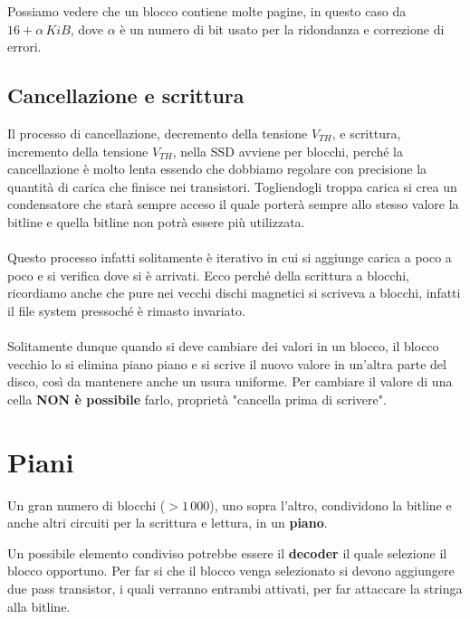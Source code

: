 Possiamo vedere che un blocco contiene molte pagine, in questo caso da $16 + \alpha \,KiB$, dove $\alpha$ è un numero di bit usato per la ridondanza e correzione di errori.

\subsection{Cancellazione e scrittura}
Il processo di cancellazione, decremento della tensione $V_{TH}$, e scrittura, incremento della tensione $V_{TH}$, nella SSD avviene per blocchi, perché la cancellazione è molto lenta essendo che dobbiamo regolare con precisione la quantità di carica che finisce nei transistori. Togliendogli troppa carica si crea un condensatore che starà sempre acceso il quale porterà sempre allo stesso valore la bitline e quella bitline non potrà essere più utilizzata.

\paragraph{}

Questo processo infatti solitamente è iterativo in cui si aggiunge carica a poco a poco e si verifica dove si è arrivati. Ecco perché della scrittura a blocchi, ricordiamo anche che pure nei vecchi dischi magnetici si scriveva a blocchi, infatti il file system pressoché è rimasto invariato.

\paragraph{}
Solitamente dunque quando si deve cambiare dei valori in un blocco, il blocco vecchio lo si elimina piano piano e si scrive il nuovo valore in un'altra parte del disco, così da mantenere anche un usura uniforme. Per cambiare il valore di una cella \textbf{NON è possibile} farlo, proprietà "cancella prima di scrivere".

\newpage
\section{Piani}

Un gran numero di blocchi ($> 1\,000$), uno sopra l'altro, condividono la bitline e anche altri circuiti per la scrittura e lettura, in un \textbf{piano}.

Un possibile elemento condiviso potrebbe essere il \textbf{decoder} il quale selezione il blocco opportuno. Per far si che il blocco venga selezionato si devono aggiungere due pass transistor, i quali verranno entrambi attivati, per far attaccare la stringa alla bitline.

